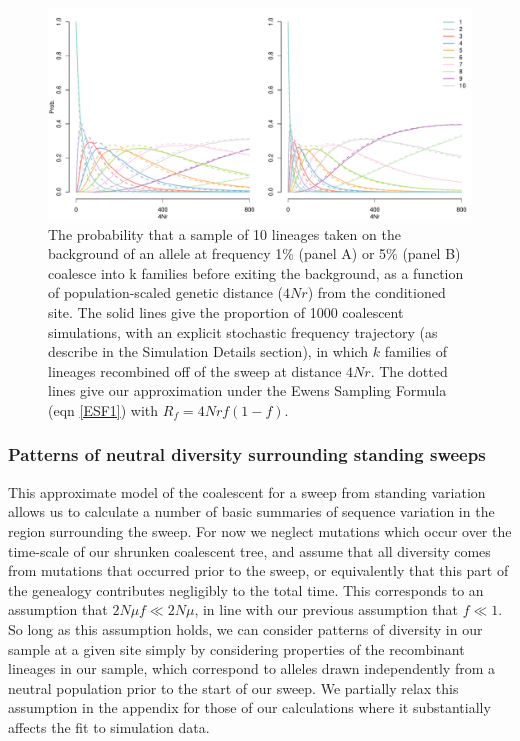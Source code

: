 \documentclass[a4paper,10pt]{article}
\begin{document}
\begin{figure}
	\includegraphics[width = \textwidth]{../Paper_Figures/Prob_hap_distribution.pdf}
\caption{The probability that a sample of 10 lineages taken on the background of an allele at frequency 1\% (panel A) or 5\% (panel B) coalesce into k families before exiting the background, as a function of population-scaled genetic distance ($4Nr$) from the conditioned site. The solid lines give the proportion of 1000 coalescent simulations, with an explicit stochastic frequency trajectory (as describe in the Simulation Details section), in which $k$ families of lineages recombined off of the sweep at distance $4Nr$.  The dotted lines give our approximation under the Ewens Sampling Formula (eqn \eqref{ESF1}) with $R_f=4Nrf(1-f)$. } \label{Prob_hap_distribution}
\end{figure}



\subsubsection*{Patterns of neutral diversity surrounding standing sweeps}
This approximate model of the coalescent for a sweep from standing variation allows us to calculate a number of basic summaries of sequence variation in the region surrounding the sweep. For now we neglect mutations which occur over the time-scale of our shrunken coalescent tree, and assume that all diversity comes from mutations that occurred prior to the sweep, or equivalently that this part of the genealogy contributes negligibly to the total time. This corresponds to an assumption that $2N \mu f \ll 2N\mu$, in line with our previous assumption that $f \ll 1$. So long as this assumption holds, we can consider patterns of diversity in our sample at a given site simply by considering properties of the recombinant lineages in our sample, which correspond to alleles drawn independently from a neutral population prior to the start of our sweep. We partially relax this assumption in the appendix for those of our calculations where it substantially affects the fit to simulation data.
\end{document}
